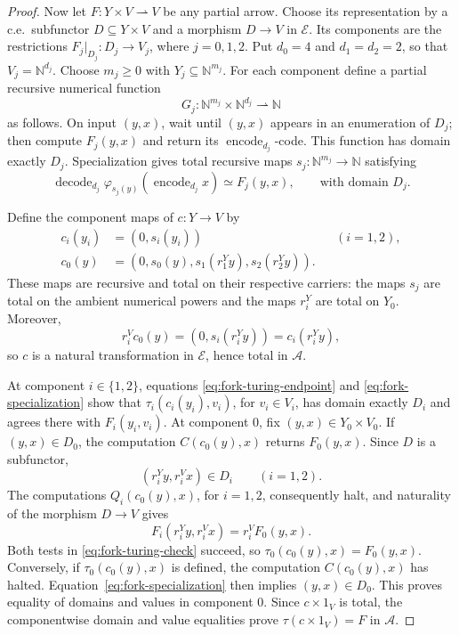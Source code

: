 \documentclass[11pt]{article}
\newcommand{\N}{\mathbb N}
\begin{document}
\begin{proof}
Now let $F:Y\times V\rightharpoonup V$ be any partial arrow.
Choose its representation by a c.e.\ subfunctor
$D\subseteq Y\times V$ and a morphism $D\to V$ in
$\mathcal E$. Its components are the restrictions
$F_j|_{D_j}:D_j\to V_j$, where $j=0,1,2$.
Put $d_0=4$ and $d_1=d_2=2$, so that $V_j=\N^{d_j}$.
Choose $m_j\geq0$ with $Y_j\subseteq\N^{m_j}$.
For each component define a partial recursive numerical function
\[
 G_j:\N^{m_j}\times\N^{d_j}\rightharpoonup\N
\]
as follows. On input $(y,x)$, wait until $(y,x)$ appears in an
enumeration of $D_j$; then compute $F_j(y,x)$ and return its
$\operatorname{encode}_{d_j}$-code. This function has domain
exactly $D_j$.
Specialization gives total recursive maps
$s_j:\N^{m_j}\to\N$ satisfying
\begin{equation}\label{eq:fork-specialization}
 \operatorname{decode}_{d_j}
   \varphi_{s_j(y)}(\operatorname{encode}_{d_j}x)
 \simeq F_j(y,x),
 \qquad\text{with domain }D_j.
\end{equation}

Define the component maps of $c:Y\to V$ by
\begin{align*}
 c_i(y_i)&=(0,s_i(y_i)) &&(i=1,2),\\
 c_0(y)&=(0,s_0(y),s_1(r_1^Yy),s_2(r_2^Yy)).
\end{align*}
These maps are recursive and total on their respective carriers:
the maps $s_j$ are total on the ambient numerical powers and the
maps $r_i^Y$ are total on $Y_0$. Moreover,
\[
 r_i^Vc_0(y)=(0,s_i(r_i^Yy))=c_i(r_i^Yy),
\]
so $c$ is a natural transformation in $\mathcal E$, hence total in
$\mathcal A$.

At component $i\in\{1,2\}$, equations
\eqref{eq:fork-turing-endpoint} and
\eqref{eq:fork-specialization} show that
$\tau_i(c_i(y_i),v_i)$, for $v_i\in V_i$, has domain exactly
$D_i$ and agrees there with $F_i(y_i,v_i)$.
At component $0$, fix $(y,x)\in Y_0\times V_0$.
If $(y,x)\in D_0$, the computation $C(c_0(y),x)$ returns $F_0(y,x)$.
Since $D$ is a subfunctor,
\[
 (r_i^Yy,r_i^Vx)\in D_i\qquad(i=1,2).
\]
The computations $Q_i(c_0(y),x)$, for $i=1,2$, consequently
halt, and naturality of the morphism $D\to V$ gives
\[
 F_i(r_i^Yy,r_i^Vx)=r_i^VF_0(y,x).
\]
Both tests in \eqref{eq:fork-turing-check} succeed, so
$\tau_0(c_0(y),x)=F_0(y,x)$.
Conversely, if $\tau_0(c_0(y),x)$ is defined, the computation
$C(c_0(y),x)$ has halted. Equation~\eqref{eq:fork-specialization}
then implies $(y,x)\in D_0$.
This proves equality of domains and values in component $0$. Since $c\times1_V$ is total, the componentwise domain
and value equalities prove $\tau(c\times1_V)=F$ in $\mathcal A$.
\end{proof}
\end{document}
